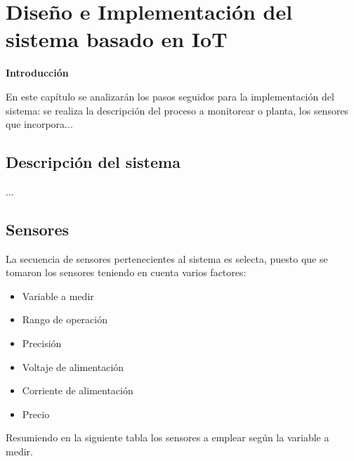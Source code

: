 \chapter{Diseño e Implementación del sistema basado en IoT}\label{cap: }

        \textbf{\Large Introducción}\newline
        
        En este capítulo se analizarán los pasos seguidos para la implementación del sistema: se realiza la descripción del proceso a monitorear o planta, los sensores que incorpora...

\section{Descripción del sistema}

    ...


\section{Sensores} \label{sec: sensores}

    La secuencia de sensores pertenecientes al sistema es selecta, puesto que se tomaron los sensores teniendo en cuenta varios factores:

    \begin{itemize}
        \item Variable a medir
        \item Rango de operación
        \item Precisión
        \item Voltaje de alimentación
        \item Corriente de alimentación
        \item Precio
    \end{itemize}

    \vspace{1cm}

    Resumiendo en la siguiente tabla los sensores a emplear según la variable a medir.

